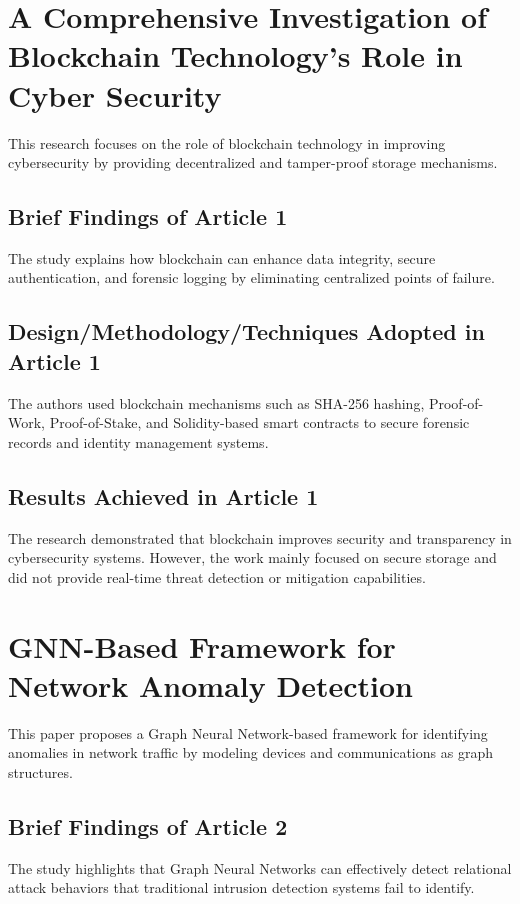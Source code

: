 \documentclass[12pt,a4paper]{report}
\begin{document}
\section{A Comprehensive Investigation of Blockchain Tech\-nology's Role in Cyber Security \cite{paper1}}
This research focuses on the role of blockchain technology in improving cybersecurity by providing decentralized and tamper-proof storage mechanisms.

\subsection{Brief Findings of Article 1}
The study explains how blockchain can enhance data integrity, secure authentication, and forensic logging by eliminating centralized points of failure.

\subsection{Design/Methodology/Techniques Adopted in Article 1}
The authors used blockchain mechanisms such as SHA-256 hashing, Proof-of-Work, Proof-of-Stake, and Solidity-based smart contracts to secure forensic records and identity management systems.

\subsection{Results Achieved in Article 1}
The research demonstrated that blockchain improves security and transparency in cybersecurity systems. However, the work mainly focused on secure storage and did not provide real-time threat detection or mitigation capabilities.

\section{GNN-Based Framework for Network Anomaly Detection \cite{paper2}}
This paper proposes a Graph Neural Network-based framework for identifying anomalies in network traffic by modeling devices and communications as graph structures.

\subsection{Brief Findings of Article 2}
The study highlights that Graph Neural Networks can effectively detect relational attack behaviors that traditional intrusion detection systems fail to identify.
\end{document}
